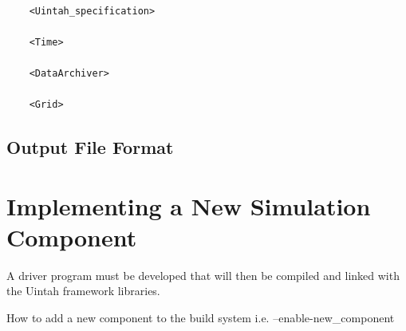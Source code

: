 \documentclass[12pt]{report}
\begin{document}
\begin{Verbatim}[fontsize=\footnotesize]

	<Uintah_specification>

	<Time>

	<DataArchiver>

	<Grid>

\end{Verbatim}

\section{Output File Format}



\chapter{Implementing a New Simulation Component}

A driver program must be developed that will then be compiled and
linked with the Uintah framework libraries.

How to add a new component to the build system i.e. --enable-new\_component
\end{document}
